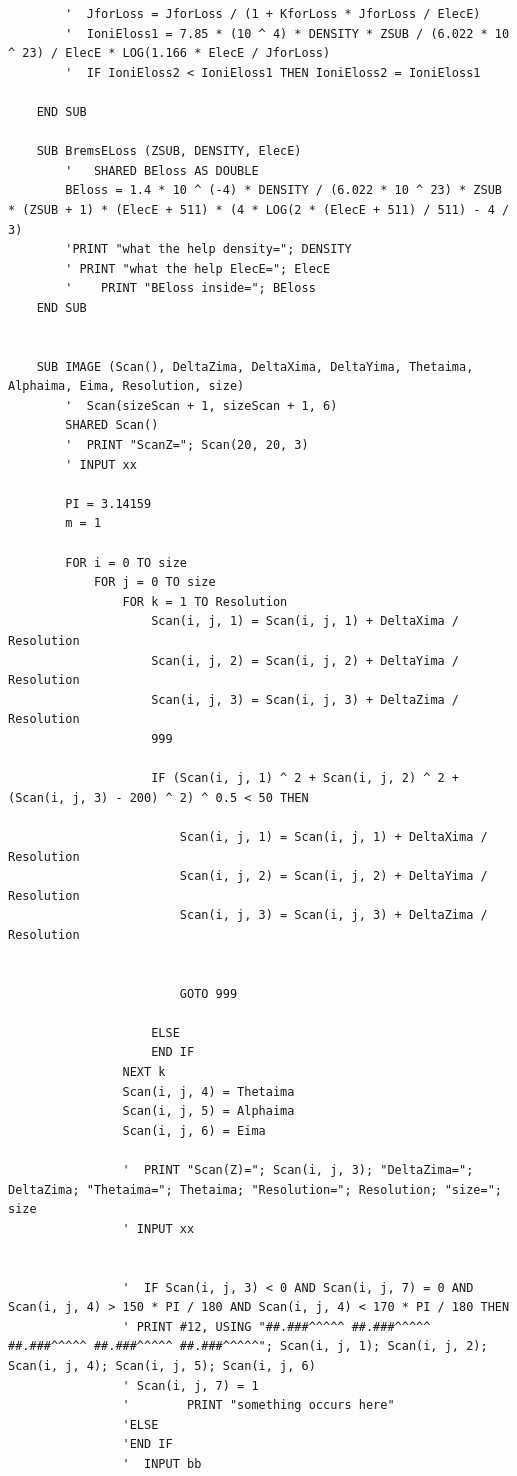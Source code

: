 \documentclass[10pt, reqno]{exam}
\begin{document}
\begin{verbatim}
        '  JforLoss = JforLoss / (1 + KforLoss * JforLoss / ElecE)
        '  IoniEloss1 = 7.85 * (10 ^ 4) * DENSITY * ZSUB / (6.022 * 10 ^ 23) / ElecE * LOG(1.166 * ElecE / JforLoss)
        '  IF IoniEloss2 < IoniEloss1 THEN IoniEloss2 = IoniEloss1
    
    END SUB
    
    SUB BremsELoss (ZSUB, DENSITY, ElecE)
        '   SHARED BEloss AS DOUBLE
        BEloss = 1.4 * 10 ^ (-4) * DENSITY / (6.022 * 10 ^ 23) * ZSUB * (ZSUB + 1) * (ElecE + 511) * (4 * LOG(2 * (ElecE + 511) / 511) - 4 / 3)
        'PRINT "what the help density="; DENSITY
        ' PRINT "what the help ElecE="; ElecE
        '    PRINT "BEloss inside="; BEloss
    END SUB
    
    
    SUB IMAGE (Scan(), DeltaZima, DeltaXima, DeltaYima, Thetaima, Alphaima, Eima, Resolution, size)
        '  Scan(sizeScan + 1, sizeScan + 1, 6)
        SHARED Scan()
        '  PRINT "ScanZ="; Scan(20, 20, 3)
        ' INPUT xx
    
        PI = 3.14159
        m = 1
    
        FOR i = 0 TO size
            FOR j = 0 TO size
                FOR k = 1 TO Resolution
                    Scan(i, j, 1) = Scan(i, j, 1) + DeltaXima / Resolution
                    Scan(i, j, 2) = Scan(i, j, 2) + DeltaYima / Resolution
                    Scan(i, j, 3) = Scan(i, j, 3) + DeltaZima / Resolution
                    999
    
                    IF (Scan(i, j, 1) ^ 2 + Scan(i, j, 2) ^ 2 + (Scan(i, j, 3) - 200) ^ 2) ^ 0.5 < 50 THEN
    
                        Scan(i, j, 1) = Scan(i, j, 1) + DeltaXima / Resolution
                        Scan(i, j, 2) = Scan(i, j, 2) + DeltaYima / Resolution
                        Scan(i, j, 3) = Scan(i, j, 3) + DeltaZima / Resolution
    
    
                        GOTO 999
    
                    ELSE
                    END IF
                NEXT k
                Scan(i, j, 4) = Thetaima
                Scan(i, j, 5) = Alphaima
                Scan(i, j, 6) = Eima
    
                '  PRINT "Scan(Z)="; Scan(i, j, 3); "DeltaZima="; DeltaZima; "Thetaima="; Thetaima; "Resolution="; Resolution; "size="; size
                ' INPUT xx
    
    
                '  IF Scan(i, j, 3) < 0 AND Scan(i, j, 7) = 0 AND Scan(i, j, 4) > 150 * PI / 180 AND Scan(i, j, 4) < 170 * PI / 180 THEN
                ' PRINT #12, USING "##.###^^^^^ ##.###^^^^^ ##.###^^^^^ ##.###^^^^^ ##.###^^^^^"; Scan(i, j, 1); Scan(i, j, 2); Scan(i, j, 4); Scan(i, j, 5); Scan(i, j, 6)
                ' Scan(i, j, 7) = 1
                '        PRINT "something occurs here"
                'ELSE
                'END IF
                '  INPUT bb
    

\end{verbatim}
\end{document}
